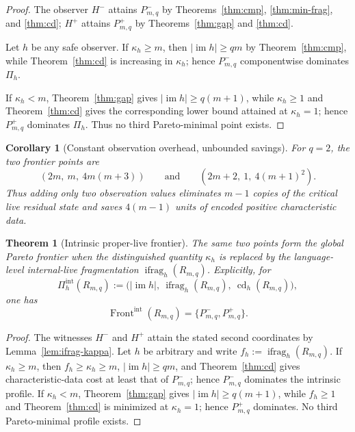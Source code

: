 \documentclass[11pt]{article}
\newtheorem{theorem}[definition]{Theorem}
\newtheorem{corollary}[definition]{Corollary}
\newcommand{\im}{\operatorname{im}}
\newcommand{\cd}{\operatorname{cd}}
\newcommand{\Front}{\operatorname{Front}}
\newcommand{\ifrag}{\operatorname{ifrag}}
\begin{document}
\begin{proof}
The observer $H^-$ attains $P^-_{m,q}$ by
Theorems~\ref{thm:cmp}, \ref{thm:min-frag}, and \ref{thm:cd}; $H^+$ attains
$P^+_{m,q}$ by Theorems~\ref{thm:gap} and \ref{thm:cd}.

Let $h$ be any safe observer.  If $\kappa_h\ge m$, then
$|\im h|\ge qm$ by Theorem~\ref{thm:cmp}, while
Theorem~\ref{thm:cd} is increasing in $\kappa_h$; hence $P^-_{m,q}$
componentwise dominates $\Pi_h$.

If $\kappa_h<m$, Theorem~\ref{thm:gap} gives
$|\im h|\ge q(m+1)$, while $\kappa_h\ge1$ and
Theorem~\ref{thm:cd} gives the corresponding lower bound attained at
$\kappa_h=1$; hence $P^+_{m,q}$ dominates $\Pi_h$.
Thus no third Pareto-minimal point exists.
\end{proof}

\begin{corollary}[Constant observation overhead, unbounded savings]
For $q=2$, the two frontier points are
\[
 (2m,\ m,\ 4m(m+3))
 \qquad\text{and}\qquad
 (2m+2,\ 1,\ 4(m+1)^2).
\]
Thus adding only two observation values eliminates $m-1$ copies of the
critical live residual state and saves $4(m-1)$ units of encoded positive
characteristic data.
\end{corollary}


\begin{theorem}[Intrinsic proper-live frontier]
\label{thm:intrinsic-frontier}
The same two points form the global Pareto frontier when the distinguished
quantity $\kappa_h$ is replaced by the language-level internal-live
fragmentation $\ifrag_h(R_{m,q})$.  Explicitly, for
\[
 \Pi_h^{\mathrm{int}}(R_{m,q})
 :=
 \bigl(|\im h|,\ \ifrag_h(R_{m,q}),\ \cd_h(R_{m,q})\bigr),
\]
one has
\[
 \boxed{
 \Front^{\mathrm{int}}(R_{m,q})
 =\{P^-_{m,q},P^+_{m,q}\}.
 }
\]
\end{theorem}

\begin{proof}
The witnesses $H^-$ and $H^+$ attain the stated second coordinates by
Lemma~\ref{lem:ifrag-kappa}.  Let $h$ be arbitrary and write
$f_h:=\ifrag_h(R_{m,q})$.  If $\kappa_h\ge m$, then
$f_h\ge\kappa_h\ge m$, $|\im h|\ge qm$, and
Theorem~\ref{thm:cd} gives characteristic-data cost at least that of
$P^-_{m,q}$; hence $P^-_{m,q}$ dominates the intrinsic profile.  If
$\kappa_h<m$, Theorem~\ref{thm:gap} gives
$|\im h|\ge q(m+1)$, while $f_h\ge1$ and
Theorem~\ref{thm:cd} is minimized at $\kappa_h=1$; hence $P^+_{m,q}$
dominates.  No third Pareto-minimal profile exists.
\end{proof}
\end{document}
